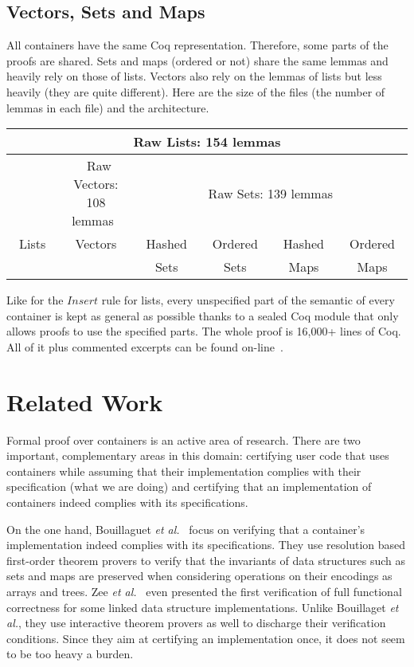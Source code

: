 \documentclass[runningheads,a4paper]{llncs}
\newcommand{\etal}{\textit{et al.}\xspace}
\newcommand{\Insert}{\ensuremath{\mathit{Insert}}\xspace}
\newcommand{\beforesec}{\vspace{-0.2cm}}
\newcommand{\aftersec}{\vspace{-0.2cm}}
\newcommand{\beforesub}{\vspace{-0.2cm}}
\newcommand{\aftersub}{\vspace{-0.1cm}}
\begin{document}
\beforesub
\subsection{Vectors, Sets and Maps}
\aftersub

All containers have the same Coq representation. Therefore, some parts of the
proofs are shared. Sets and maps (ordered or not) share the same lemmas and
heavily rely on those of lists. Vectors also rely on the lemmas of lists but
less heavily (they are quite different). Here are the size of the files
(the number of lemmas in each file) and the architecture.
\begin{center}
\begin{tabular}{|c|c|c|c|c|c|}
\hline
\multicolumn{6}{|c|}{Raw Lists: 154 lemmas}\\
\hline
& ~Raw Vectors: 108 lemmas~ & \multicolumn{4}{|c|}{Raw Sets: 139 lemmas}\\
\cline{2-6}
~Lists~ & Vectors & ~Hashed~ & ~Ordered~ & ~Hashed~ & ~Ordered~ \\
 &  & Sets & Sets & Maps & Maps \\
\hline
\end{tabular}
\end{center}
Like for the $\Insert$ rule for lists, every unspecified part of the semantic
of every container is kept as general as possible thanks to a sealed Coq module
that only allows proofs to use the specified parts. The whole proof is 16,000+
lines of Coq. All of it plus commented excerpts can be found
on-line~\cite{dross:2011:fc-long}.

\beforesec
\section{Related Work}
\label{sec:related-works}
\aftersec

Formal proof over containers is an active area of research.  There are two
important, complementary areas in this domain: certifying user code that uses
containers while assuming that their implementation complies with their
specification (what we are doing) and certifying that an implementation of
containers indeed complies with its specifications.

On the one hand, Bouillaguet \etal~\cite{bouillaguet:2007:vmcai} focus on
verifying that a container's implementation indeed complies with its
specifications. They use resolution based first-order theorem provers to verify
that the invariants of data structures such as sets and maps are preserved when
considering operations on their encodings as arrays and trees.  Zee
\etal~\cite{zee:2008:pldi} even presented the first verification of full
functional correctness for some linked data structure implementations. Unlike
Bouillaget \etal, they use interactive theorem provers as well to discharge
their verification conditions. Since they aim at certifying an implementation
once, it does not seem to be too heavy a burden.
\end{document}
